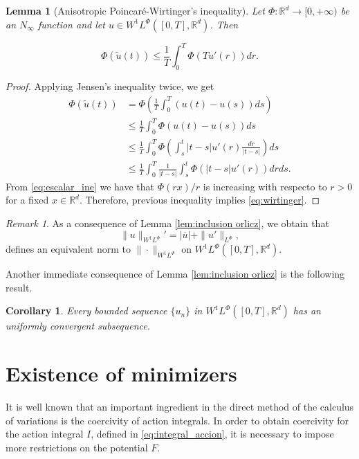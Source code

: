 \documentclass[twoside]{article}
\newtheorem{cor}[thm]{Corollary}
\newtheorem{lem}[thm]{Lemma}
\theoremstyle{remark}
\newtheorem{comentario}{Remark}
\newcommand{\orlnor}{\|_{L^{\Phi}}}
\newcommand{\lphi}{L^{\Phi}}
\newcommand{\wphi}{W^{1}\lphi}
\newcommand{\sobnor}{\|_{W^{1}\lphi}}
\newcommand{\rr}{\mathbb{R}}
\renewcommand{\leq}{\leqslant}
\begin{document}
\begin{lem}[Anisotropic Poincar\'e-Wirtinger's inequality]\label{lem:inclusion orliczII} Let $\Phi:\rr^d\to [0,+\infty)$ be an $N_{\infty}$
function and let $u\in\wphi\left([0,T],\rr^d\right)$. Then

\begin{equation}\label{eq:wirtinger}
  \Phi\left(\tilde{u}(t)\right)\leq\frac{1}{T} \int_0^T \Phi\left(Tu'(r)\right)dr.\tag{A.P-W.I}
\end{equation}

\end{lem}

\begin{proof}  Applying Jensen's inequality twice, we get
\begin{equation*}
\begin{split}
\Phi(\tilde{u}(t))&=\Phi\left(\frac{1}{T}\int_0^T \left(u(t)-u(s)\right) ds\right)\\
&\leq\frac{1}{T}\int_0^T \Phi(u(t)-u(s))ds\\
&\leq \frac{1}{T}\int_0^T \Phi\left(\int_s^t |t-s| u'(r)\frac{dr}{|t-s|}\right)ds\\
&\leq 
\frac{1}{T}\int_0^T \frac{1}{|t-s|} \int_s^t\Phi\left(|t-s| u'(r)\right)drds.
\end{split}
\end{equation*}
From \ref{eq:escalar_ine} we have that $\Phi(rx)/r$ is increasing with respecto to $r>0$ for a fixed $x\in\rr^d$. Therefore, previous inequality  implies \eqref{eq:wirtinger}.
\end{proof}


\begin{comentario}\label{com:equiv-norm} As a consequence of Lemma \ref{lem:inclusion orlicz}, we obtain that 
  \[\|u\sobnor'=|\overline{u}|+\|u'\orlnor,\]
  defines an equivalent norm to $\|\cdot\sobnor$ on $\wphi([0,T],\rr^d)$.   
\end{comentario}
Another immediate consequence of  Lemma \ref{lem:inclusion orlicz} is the following result.
 \begin{cor}\label{cor:unif_conv} Every bounded sequence $\{u_n\}$ in  $\wphi([0,T],\rr^d)$  has an uniformly convergent subsequence. 
\end{cor}

\section{Existence of minimizers}\label{sec:existencia}


It is well known that an important ingredient in the direct method of the calculus of variations is the coercivity of action integrals. In order to obtain  coercivity for the action integral $I$, defined in  \eqref{eq:integral_accion}, it is necessary to impose more restrictions on the potential $F$.
\end{document}
